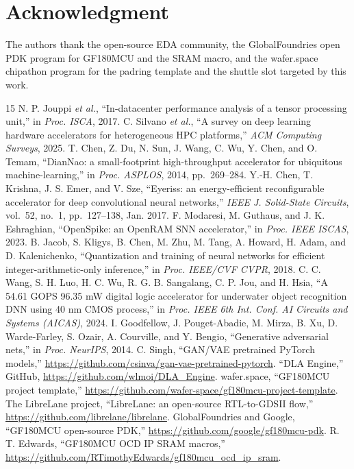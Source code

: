 \documentclass[conference,a4paper]{APSIPA2026}
\begin{document}
\section*{Acknowledgment}
The authors thank the open-source EDA community, the GlobalFoundries open PDK program for GF180MCU and the SRAM macro, and the wafer.space chipathon program for the padring template and the shuttle slot targeted by this work.

\begin{thebibliography}{15}
 N. P. Jouppi \emph{et al.}, ``In-datacenter performance analysis of a tensor processing unit,'' in \emph{Proc. ISCA}, 2017.
 C. Silvano \emph{et al.}, ``A survey on deep learning hardware accelerators for heterogeneous HPC platforms,'' \emph{ACM Computing Surveys}, 2025.
 T. Chen, Z. Du, N. Sun, J. Wang, C. Wu, Y. Chen, and O. Temam, ``DianNao: a small-footprint high-throughput accelerator for ubiquitous machine-learning,'' in \emph{Proc. ASPLOS}, 2014, pp.~269--284.
 Y.-H. Chen, T. Krishna, J. S. Emer, and V. Sze, ``Eyeriss: an energy-efficient reconfigurable accelerator for deep convolutional neural networks,'' \emph{IEEE J. Solid-State Circuits}, vol.~52, no.~1, pp.~127--138, Jan. 2017.
 F. Modaresi, M. Guthaus, and J. K. Eshraghian, ``OpenSpike: an OpenRAM SNN accelerator,'' in \emph{Proc. IEEE ISCAS}, 2023.
 B. Jacob, S. Kligys, B. Chen, M. Zhu, M. Tang, A. Howard, H. Adam, and D. Kalenichenko, ``Quantization and training of neural networks for efficient integer-arithmetic-only inference,'' in \emph{Proc. IEEE/CVF CVPR}, 2018.
 C. C. Wang, S. H. Luo, H. C. Wu, R. G. B. Sangalang, C. P. Jou, and H. Hsia, ``A 54.61 GOPS 96.35 mW digital logic accelerator for underwater object recognition DNN using 40 nm CMOS process,'' in \emph{Proc. IEEE 6th Int. Conf. AI Circuits and Systems (AICAS)}, 2024.
 I. Goodfellow, J. Pouget-Abadie, M. Mirza, B. Xu, D. Warde-Farley, S. Ozair, A. Courville, and Y. Bengio, ``Generative adversarial nets,'' in \emph{Proc. NeurIPS}, 2014.
 C. Singh, ``GAN/VAE pretrained PyTorch models,'' \url{https://github.com/csinva/gan-vae-pretrained-pytorch}.
 ``DLA Engine,'' GitHub, \url{https://github.com/wlmoi/DLA_Engine}.
 wafer.space, ``GF180MCU project template,'' \url{https://github.com/wafer-space/gf180mcu-project-template}.
 The LibreLane project, ``LibreLane: an open-source RTL-to-GDSII flow,'' \url{https://github.com/librelane/librelane}.
 GlobalFoundries and Google, ``GF180MCU open-source PDK,'' \url{https://github.com/google/gf180mcu-pdk}.
 R. T. Edwards, ``GF180MCU OCD IP SRAM macros,'' \url{https://github.com/RTimothyEdwards/gf180mcu_ocd_ip_sram}.
\end{thebibliography}
\end{document}
